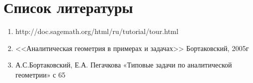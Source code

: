 \section{Список литературы}
	\begin{enumerate}
		\item{http://doc.sagemath.org/html/ru/tutorial/tour.html}
		\item{<<Аналитическая геометрия в примерах и задачах>> Бортаковский, 2005г}
		\item{А.С.Бортаковский, Е.А. Пегачкова «Типовые задачи по аналитической геометрии» с 65}
	\end{enumerate}
	